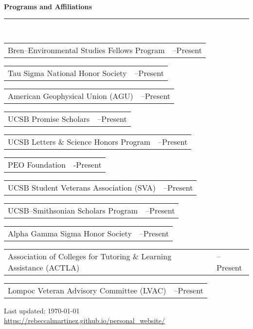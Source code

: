 \documentclass[letterpaper]{article}
\makeatletter
\def\footerlink{https://rebeccalmartinez.github.io/personal\_website/}
\newcommand{\sectionheader}[1]{%
  \noindent\textbf{\large #1} \\[-1ex]
  \noindent\rule{\linewidth}{0.4pt}\\[0.8ex]
}
\newlength{\datecolwidth}
\newcommand{\cvitem}[2]{%
  \noindent
  \begin{tabularx}{\textwidth}{@{}>{\raggedright\arraybackslash}X@{\hspace{1em}}>{\raggedleft\arraybackslash}p{\datecolwidth}@{}}
    #1 & #2 \\
  \end{tabularx}
  \vspace{0.2em}
}
\makeatother
\begin{document}
\sectionheader{Programs and Affiliations}
\cvitem{Bren–Environmental Studies Fellows Program}{2025–Present}  
\cvitem{Tau Sigma National Honor Society}{2025–Present}  
\cvitem{American Geophysical Union (AGU)}{2025–Present}  
\cvitem{UCSB Promise Scholars}{2024–Present}  
\cvitem{UCSB Letters \& Science Honors Program}{2024–Present} \cvitem{PEO Foundation}{2024-Present} 
\cvitem{UCSB Student Veterans Association (SVA)}{2024–Present}  
\cvitem{UCSB–Smithsonian Scholars Program}{2023–Present}  
\cvitem{Alpha Gamma Sigma Honor Society}{2019–Present}  
\cvitem{Association of Colleges for Tutoring \& Learning Assistance (ACTLA)}{2020–Present}  
\cvitem{Lompoc Veteran Advisory Committee (LVAC)}{2018–Present}  

\bigskip
\begin{center}
  \begin{footnotesize}
    Last updated: \today \\
    \href{\footerlink}{\url{\footerlink}}
  \end{footnotesize}
\end{center}
\end{document}
